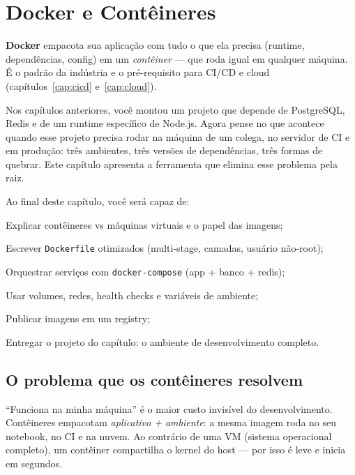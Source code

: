 \chapter{Docker e Contêineres}
\label{cap:docker}

\begin{caixaconceito}
\textbf{Docker} empacota sua aplicação com tudo o que ela precisa (runtime,
dependências, config) em um \emph{contêiner} — que roda igual em qualquer
máquina. É o padrão da indústria \cite{docker-docs} e o pré-requisito para
CI/CD e cloud (capítulos~\ref{cap:cicd} e~\ref{cap:cloud}).
\end{caixaconceito}

Nos capítulos anteriores, você montou um projeto que depende de PostgreSQL,
Redis e de um runtime específico de Node.js. Agora pense no que acontece quando
esse projeto precisa rodar na máquina de um colega, no servidor de CI e em
produção: três ambientes, três versões de dependências, três formas de
quebrar. Este capítulo apresenta a ferramenta que elimina esse problema pela
raiz.

Ao final deste capítulo, você será capaz de:
\begin{objetivos}
  \item Explicar contêineres vs máquinas virtuais e o papel das imagens;
  \item Escrever \texttt{Dockerfile} otimizados (multi-stage, camadas, usuário não-root);
  \item Orquestrar serviços com \texttt{docker-compose} (app + banco + redis);
  \item Usar volumes, redes, health checks e variáveis de ambiente;
  \item Publicar imagens em um registry;
  \item Entregar o projeto do capítulo: o ambiente de desenvolvimento completo.
\end{objetivos}

\section{O problema que os contêineres resolvem}

``Funciona na minha máquina'' é o maior custo invisível do desenvolvimento.
Contêineres empacotam \emph{aplicativo + ambiente}: a mesma imagem roda no seu
notebook, no CI e na nuvem. Ao contrário de uma VM (sistema operacional
completo), um contêiner compartilha o kernel do host — por isso é leve e
inicia em segundos.

